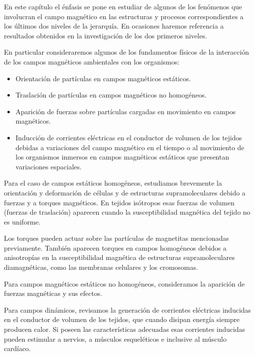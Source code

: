 En este capítulo el énfasis se pone en estudiar de algunos de los fenómenos que involucran el campo magnético en las estructuras y procesos correspondientes a los últimos dos niveles de la jerarquía. En ocasiones haremos referencia a resultados obtenidos en la investigación de los dos primeros niveles.

En particular consideraremos algunos de los fundamentos físicos de la interacción de los campos magnéticos ambientales con los organismos:

\begin{itemize}
	\item Orientación de partículas en campos magnéticos estáticos.
	
	\item Traslación de partículas en campos magnéticos no homogéneos.
	
	\item Aparición de fuerzas sobre partículas cargadas en movimiento en campos magnéticos.
	
	\item Inducción de corrientes eléctricas en el conductor de volumen de los tejidos debidas a variaciones del campo magnético en el tiempo o al movimiento de los organismos inmersos en campos magnéticos estáticos que presentan variaciones espaciales.

\end{itemize}

Para el caso de campos estáticos homogéneos, estudiamos brevemente la orientación y deformación de células y de estructuras supramoleculares debido a fuerzas y a torques magnéticos. En tejidos isótropos esas fuerzas de volumen (fuerzas de traslación) aparecen cuando la susceptibilidad magnética del tejido no es uniforme.

Los torques pueden actuar sobre las partículas de magnetitas mencionadas previamente. También aparecen torques en campos homogéneos debidos a anisotropías en la susceptibilidad magnética de estructuras supramoleculares diamagnéticas, como las membranas celulares y los cromosomas.

Para campos magnéticos estáticos no homogéneos, consideramos la aparición de fuerzas magnéticas y sus efectos.

Para campos dinámicos, revisamos la generación de corrientes eléctricas inducidas en el conductor de volumen de los tejidos, que cuando disipan energía siempre producen calor. Si poseen las características adecuadas esas corrientes inducidas pueden estimular a nervios, a músculos esqueléticos e inclusive al músculo cardíaco.

